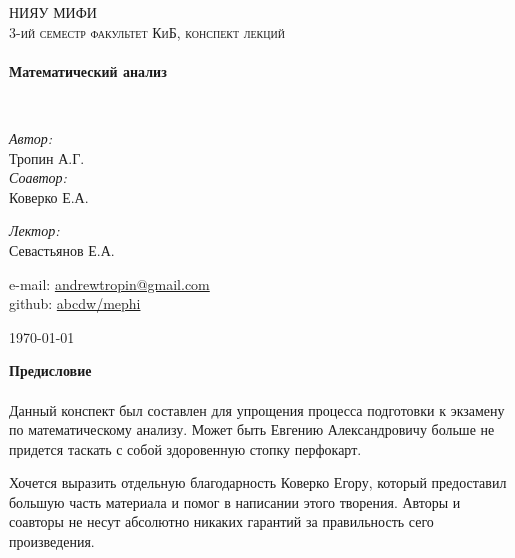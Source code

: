 \begin{titlepage}
  \begin{center}


    \textsc{\LARGE НИЯУ МИФИ}\\[1.5cm]

    \textsc{\Large 3-ий семестр факультет КиБ, конспект лекций}\\[0.5cm]

    \HRule \\[0.4cm]
    {\huge \bfseries Математический анализ\\[0.4cm]}

    \HRule \\[1.5cm]

    \begin{minipage}{0.4\textwidth}
      \begin{flushleft} \large
        \emph{Автор:}\\
        Тропин \textsc{А.Г.} \\
        \emph{Соавтор:}\\
        Коверко \textsc{Е.А.}
      \end{flushleft}
    \end{minipage}
    \begin{minipage}{0.4\textwidth}
      \begin{flushright} \large
        \emph{Лектор:} \\
        Севастьянов \textsc{Е.А.}
      \end{flushright}
    \end{minipage}

    \vfill
    \begin{flushleft}
      e-mail: \href{mailto:andrewtropin@gmail.com}{andrewtropin@gmail.com} \\
      github: \href{http://github.com/abcdw/mephi}{abcdw/mephi}
    \end{flushleft}
    {\large \today}
  \end{center}
\end{titlepage}

{\bfseries Предисловие} \\
\HRule \\[0.4cm]

Данный конспект был составлен для упрощения процесса подготовки к экзамену по
математическому анализу. Может быть Евгению Александровичу больше не
придется таскать с собой здоровенную стопку перфокарт.

Хочется выразить отдельную благодарность Коверко Егору, который предоставил
большую часть материала и помог в написании этого творения. Авторы и соавторы
не несут абсолютно никаких гарантий за правильность сего произведения.


